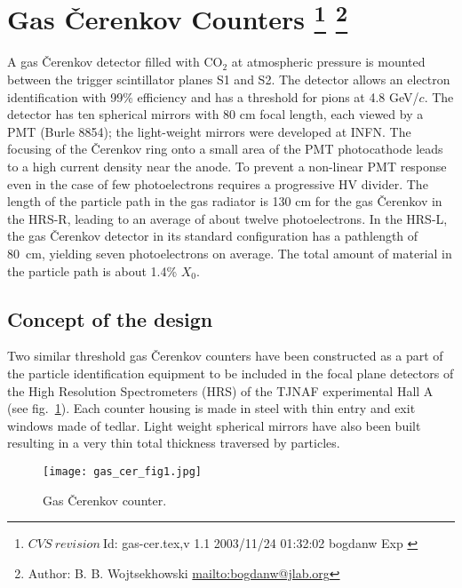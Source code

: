 
\section[Gas \c{C}erenkov Counters]{Gas \v{C}erenkov Counters
\footnote{
  $CVS~revision~ $Id: gas-cer.tex,v 1.1 2003/11/24 01:32:02 bogdanw Exp $ $
}
\footnote{Author: B. B. Wojtsekhowski \url{mailto:bogdanw@jlab.org}}
}

A gas \v{C}erenkov detector filled  with CO$_{2}$ at atmospheric 
pressure is mounted between the trigger scintillator planes S1 and S2. 
The detector allows an electron identification
with 99\% efficiency and has a threshold for pions at 4.8 GeV/$c$.
The detector has ten spherical mirrors with 80 cm focal length, each
viewed by a PMT (Burle 8854);
the light-weight mirrors were developed at INFN.
The focusing of the \v{C}erenkov ring onto a
small area of the PMT photocathode leads to a high current density  near
the anode. To prevent a non-linear PMT response even in the case of few
photoelectrons requires a progressive HV divider.
The length of the particle path in the gas radiator is 130 cm for the gas
\v{C}erenkov in the HRS-R, leading to an average of about twelve photoelectrons.
In the HRS-L, the gas \v{C}erenkov detector in its standard configuration has
a pathlength of 80~cm, yielding seven photoelectrons on average.
The total amount of material in the particle path is about 1.4\% $X_0$.

\subsection[Concept of the design]{Concept of the design}

Two similar threshold gas \v{C}erenkov counters have been constructed 
as a part of the particle identification equipment to be included 
in the focal plane detectors of the High Resolution Spectrometers (HRS) 
of the TJNAF experimental Hall A (see fig.~\ref{fig:gas-counter}). 
Each counter housing is made in steel with thin entry and 
exit windows made of tedlar.
Light weight spherical mirrors have also been built resulting in 
a very thin total thickness traversed by particles. 
%
\begin{figure}[p]
\texttt{[image: gas\_cer\_fig1.jpg]}
\caption[Gas \v{C}erenkov counter]
{Gas \v{C}erenkov counter.}
\label{fig:gas-counter}
\end{figure}

